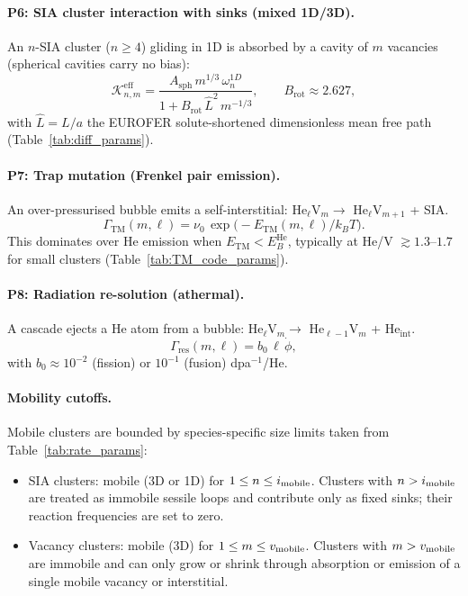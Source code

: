\documentclass[pdflatex,sn-basic]{sn-jnl} %
\begin{document}
\paragraph{P6: SIA cluster interaction with sinks (mixed 1D/3D).}
An $n$-SIA cluster ($n \geq 4$) gliding in 1D is absorbed by a cavity of
$m$ vacancies (spherical cavities carry no bias):
\begin{equation}\label{eq:P6}
    \mathcal{K}_{n,m}^{\mathrm{eff}}
    = \frac{A_{\mathrm{sph}}\,m^{1/3}\,\omega_n^{1D}}
           {1 + B_{\mathrm{rot}}\,\hat{L}^2\,m^{-1/3}},
    \qquad B_{\mathrm{rot}} \approx 2.627,
\end{equation}
with $\hat{L} = L/a$ the EUROFER solute-shortened dimensionless mean free
path (Table~\ref{tab:diff_params}).

\paragraph{P7: Trap mutation (Frenkel pair emission).}
An over-pressurised bubble emits a self-interstitial:
He$_\ell$V$_m \to$ He$_\ell$V$_{m+1}$ + SIA.
\begin{equation}\label{eq:P7}
    \Gamma_{\mathrm{TM}}(m,\ell)
    = \nu_0\,\exp\!\bigl(-E_{\mathrm{TM}}(m,\ell)/k_BT\bigr).
\end{equation}
This dominates over He emission when $E_{\mathrm{TM}} < E_B^{\mathrm{He}}$,
typically at He/V $\gtrsim 1.3$--$1.7$ for small clusters
(Table~\ref{tab:TM_code_params}).

\paragraph{P8: Radiation re-solution (athermal).}
A cascade ejects a He atom from a bubble:
He$_\ell$V$_m \to$ He$_{\ell-1}$V$_m$ + He$_{\mathrm{int}}$.
\begin{equation}\label{eq:P8}
    \Gamma_{\mathrm{res}}(m,\ell)
    = b_0\,\ell\,\dot{\phi},
\end{equation}
with $b_0 \approx 10^{-2}$ (fission) or $10^{-1}$ (fusion) dpa$^{-1}$/He.

\paragraph{Mobility cutoffs.}
Mobile clusters are bounded by species-specific size limits taken from
Table~\ref{tab:rate_params}:
\begin{itemize}
    \item SIA clusters: mobile (3D or 1D) for $1 \leq n \leq i_{\rm mobile}$.
    Clusters with $n > i_{\rm mobile}$ are treated as immobile sessile loops and
    contribute only as fixed sinks; their reaction frequencies are set to zero.
    \item Vacancy clusters: mobile (3D) for $1 \leq m \leq v_{\rm mobile}$.
    Clusters with $m > v_{\rm mobile}$ are immobile and can only grow or shrink
    through absorption or emission of a single mobile vacancy or interstitial.
\end{itemize}
\end{document}
